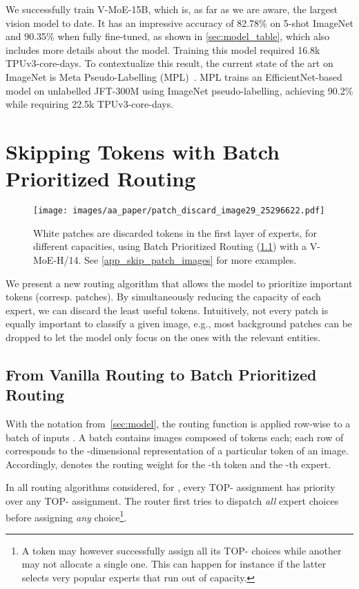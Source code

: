 \documentclass{article}
\newcommand{\abbv}{{V-MoE}}
\newcommand{\maxrouting}{Batch Prioritized Routing}
\begin{document}
We successfully train \abbv{}-15B, which is, as far as we are aware, the largest vision model to date. It has an impressive accuracy of 82.78\% on 5-shot ImageNet and 90.35\% when fully fine-tuned, as shown
in \cref{sec:model_table}, which also includes more details about the model.
Training this model required 16.8k TPUv3-core-days.
To contextualize this result, the current state of the art on ImageNet is Meta Pseudo-Labelling (MPL)~\cite{pham2020meta}.
MPL trains an EfficientNet-based model on unlabelled JFT-300M using ImageNet pseudo-labelling, achieving 90.2\% while requiring 22.5k TPUv3-core-days.
  \section{Skipping Tokens with Batch Prioritized Routing}
\label{sec:skip_patch}


\begin{figure}[tb]
\centering
\texttt{[image: images/aa\_paper/patch\_discard\_image29\_25296622.pdf]}
\caption{White patches are discarded tokens in the first layer of experts, for different capacities,
using \maxrouting{} (\cref{sec:max_routing}) with a \abbv{}-H/14. See \cref{app_skip_patch_images} for more examples.}
\label{im:patch_discard}
\end{figure}

We present a new routing algorithm that allows the model to prioritize important tokens (corresp. patches).
By simultaneously reducing the capacity of each expert, we can discard the least useful tokens. 
Intuitively, not every patch is equally important to classify a given image, e.g., most background patches can be dropped to let the model only focus on the ones with the relevant entities.


\subsection{From Vanilla Routing to \maxrouting{}}\label{sec:max_routing}
With the notation from~\cref{sec:model},
the routing function  is applied row-wise to a batch of inputs .
A batch contains  images composed of  tokens each;
each row of  corresponds to the -dimensional representation of a particular token of an image.
Accordingly,  denotes the routing weight for the -th token and the -th expert. 

In all routing algorithms considered, for , every TOP- assignment has priority over any TOP- assignment. The router first tries to dispatch \textit{all}  expert choices before assigning \textit{any}  choice\footnote{A token may however successfully assign all its TOP- choices while another may not allocate a single one. This can happen for instance if the latter selects very popular experts that run out of capacity.}.
\end{document}

